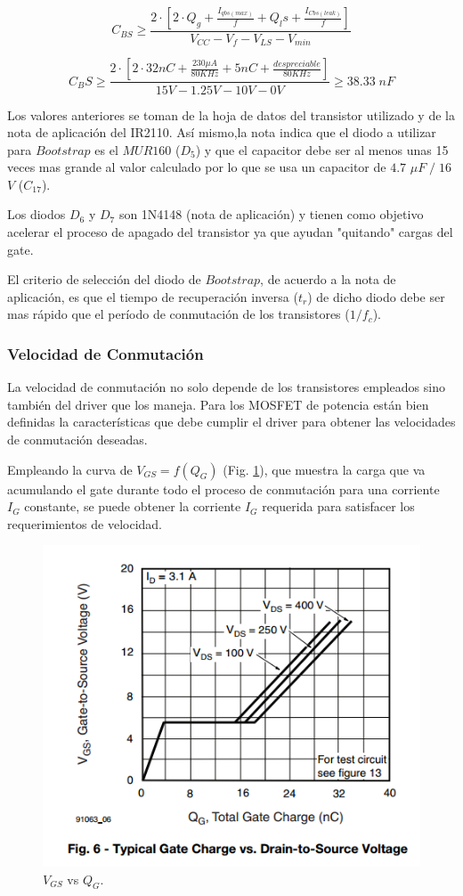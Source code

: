 \documentclass[11pt, a4paper]{article}
\begin{document}
\begin{equation}
C_{BS} \geq \frac{ 2 \cdot [2\cdot Q_g + \frac{I_{qbs(max)}}{f} + Q_ls + \frac{I_{Cbs(leak)}}{f}]}{V_{CC} - V_f - V_{LS} - V_{min}}
\label{CBS} 
\end{equation}

\[ C_BS \geq \frac{ 2 \cdot [2\cdot 32nC + \frac{230 \mu A}{80 KHz} + 5 nC + \frac{despreciable}{80 KHz}]}{15 V - 1.25 V - 10 V - 0 V} \geq 38.33 \; nF \]

Los valores anteriores se toman de la hoja de datos del transistor utilizado y de la nota de aplicación del IR2110. Así mismo,la nota indica que el diodo a utilizar para $Bootstrap$ es el $MUR160$ ($D_5$) y que el capacitor debe ser al menos unas 15 veces mas grande al valor calculado por lo que se usa un capacitor de $4.7$ $\mu F\; /\; 16$ $V$ ($C_{17}$).

Los diodos $D_6$ y $D_7$ son 1N4148 (nota de aplicación) y tienen como objetivo acelerar el proceso de apagado del transistor ya que ayudan "quitando" cargas del gate.

El criterio de selección del diodo de $Bootstrap$, de acuerdo a la nota de aplicación, es que el tiempo de recuperación inversa ($t_r$) de dicho diodo debe ser mas rápido que el período de conmutación de los transistores ($1/f_c$).

\subsubsection{Velocidad de Conmutación}
La velocidad de conmutación no solo depende de los transistores empleados sino también del driver que los maneja. Para los MOSFET de potencia están bien definidas la características que debe cumplir el driver para obtener las velocidades de conmutación deseadas.

Empleando la curva de $V_{GS} = f(Q_G)$ (Fig. \ref{vgsfqg}), que muestra la carga que va acumulando el gate durante todo el proceso de conmutación para una corriente $I_G$ constante, se puede obtener la corriente $I_G$ requerida para satisfacer los requerimientos de velocidad.

\begin{figure}[h]
	\centering
	\includegraphics[width = 10 cm]{Imagenes/vgsfqg}
	\caption{$V_{GS}$ vs $Q_G$.}
	\label{vgsfqg}
\end{figure}
\end{document}
